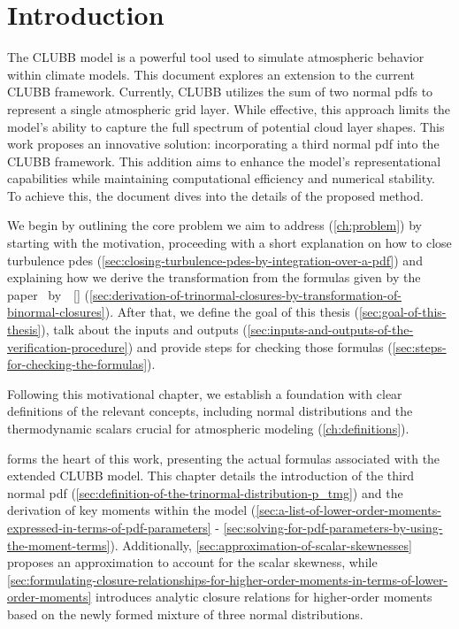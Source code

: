 \chapter{Introduction}\label{ch:introduction}

The \gls{CLUBB} model is a powerful tool used to simulate atmospheric behavior within climate models.
This document explores an extension to the current \gls{CLUBB} framework.
Currently, \gls{CLUBB} utilizes the sum of two normal \glspl{pdf}
to represent a single atmospheric grid layer.
While effective,
this approach limits the model's ability to capture the full spectrum of potential cloud layer shapes.
This work proposes an innovative solution:
incorporating a third normal \gls{pdf} into the \gls{CLUBB} framework.
This addition aims to enhance the model's representational capabilities
while maintaining computational efficiency and numerical stability.
To achieve this, the document dives into the details of the proposed method.

We begin by outlining the core problem we aim to address (\cref{ch:problem})
by starting with the motivation,
proceeding with a short explanation on how to close turbulence \glspl{pde}
(\cref{sec:closing-turbulence-pdes-by-integration-over-a-pdf})
and explaining how we derive the transformation from the formulas
given by the paper~
by~\citeauthor{larson2005using}~[\citeyear{larson2005using}]
(\cref{sec:derivation-of-trinormal-closures-by-transformation-of-binormal-closures}).
After that, we define the goal of this thesis (\cref{sec:goal-of-this-thesis}),
talk about the inputs and outputs (\cref{sec:inputs-and-outputs-of-the-verification-procedure})
and provide steps for checking those formulas (\cref{sec:steps-for-checking-the-formulas}).

Following this motivational chapter,
we establish a foundation with clear definitions of the relevant concepts,
including normal distributions and the thermodynamic scalars
crucial for atmospheric modeling (\cref{ch:definitions}).

 forms the heart of this work,
presenting the actual formulas associated with the extended \gls{CLUBB} model.
This chapter details the introduction of the third normal \gls{pdf} (\cref{sec:definition-of-the-trinormal-distribution-p_tmg})
and the derivation of key moments within the model
(\cref{sec:a-list-of-lower-order-moments-expressed-in-terms-of-pdf-parameters} -
\cref{sec:solving-for-pdf-parameters-by-using-the-moment-terms}).
Additionally,
\cref{sec:approximation-of-scalar-skewnesses} proposes an approximation
to account for the scalar skewness,
while \cref{sec:formulating-closure-relationships-for-higher-order-moments-in-terms-of-lower-order-moments}
introduces analytic closure relations
for higher-order moments based on the newly formed mixture of three normal distributions.

